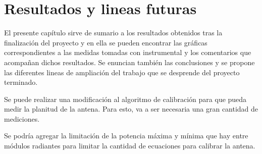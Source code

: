 \chapter{Resultados y lineas futuras}



El presente capítulo sirve de sumario a los resultados obtenidos tras la finalización del proyecto y en ella se pueden encontrar
las gráficas correspondientes a las medidas tomadas con instrumental y los comentarios que acompañan dichos resultados. Se enuncian
también las conclusiones y se propone las diferentes lineas de ampliación del trabajo que se desprende del proyecto terminado.

Se puede realizar una modificación al algoritmo de calibración para que pueda medir la planitud de la antena. Para esto, va a ser
necesaria una gran cantidad de mediciones.

Se podría agregar la limitación de la potencia máxima y mínima que hay entre módulos radiantes para limitar la cantidad de 
ecuaciones para calibrar la antena.
